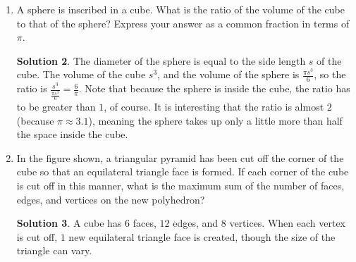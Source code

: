 \documentclass{article}
\theoremstyle{definition}
\newtheorem*{solution}{Solution}
\begin{document}
\begin{multicols}{2}
\begin{enumerate}
\begin{solution}
                When the net is folded into a three-dimensional octahedron, two hexagons and one square meet at each vertex.
                Thus, the number of vertices on the solid is $\frac{72}{3} = 24$ vertices.
                Alternatively, since each vertex of the solid is a vertex of exactly one square, it is sufficient to count just the vertices of the $64$ squares.
                Doing so yields a total of $4 \cdot 6 = 24$ vertices for the solid.
            \end{solution}
        \item A sphere is inscribed in a cube.
            What is the ratio of the volume of the cube to that of the sphere?
            Express your answer as a common fraction in terms of $\pi$.
            \begin{solution}
                The diameter of the sphere is equal to the side length $s$ of the cube.
                The volume of the cube $s^3$, and the volume of the sphere is $\frac{\pi s^3}{6}$, so the ratio is $\frac{s^3}{\frac{\pi s^3}{6}} = \frac{6}{\pi}$.
                Note that because the sphere is inside the cube, the ratio has to be greater than $1$, of course.
                It is interesting that the ratio is almost $2$ (because $\pi \approx 3.1$), meaning the sphere takes up only a little more than half the space inside the cube.
            \end{solution}
        \item In the figure shown, a triangular pyramid has been cut off the corner of the cube so that an equilateral triangle face is formed.
            If each corner of the cube is cut off in this manner, what is the maximum sum of the number of faces, edges, and vertices on the new polyhedron?
            \begin{center}
            \end{center}
            \begin{solution}
                A cube has $6$ faces, $12$ edges, and $8$ vertices. When each vertex is cut off, $1$ new equilateral triangle face is created, though the size of the triangle can vary.

\end{solution}
\end{enumerate}
\end{multicols}
\end{document}
